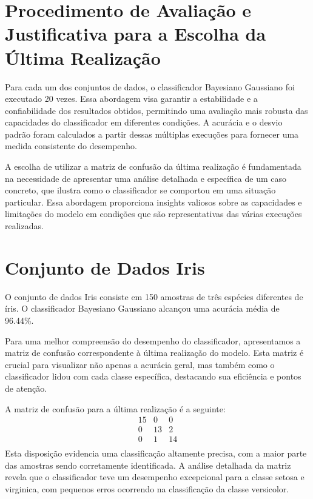 \documentclass[12pt, a4paper]{report}
\begin{document}
\section{Procedimento de Avaliação e Justificativa para a Escolha da Última Realização}

Para cada um dos conjuntos de dados, o classificador Bayesiano Gaussiano foi executado 20 vezes. Essa abordagem visa garantir a estabilidade e a confiabilidade dos resultados obtidos, permitindo uma avaliação mais robusta das capacidades do classificador em diferentes condições. A acurácia e o desvio padrão foram calculados a partir dessas múltiplas execuções para fornecer uma medida consistente do desempenho.

A escolha de utilizar a matriz de confusão da última realização é fundamentada na necessidade de apresentar uma análise detalhada e específica de um caso concreto, que ilustra como o classificador se comportou em uma situação particular. Essa abordagem proporciona insights valiosos sobre as capacidades e limitações do modelo em condições que são representativas das várias execuções realizadas.


\section{Conjunto de Dados Iris}

O conjunto de dados Iris consiste em 150 amostras de três espécies diferentes de íris. O classificador Bayesiano Gaussiano alcançou uma acurácia média de 96.44\%.

Para uma melhor compreensão do desempenho do classificador, apresentamos a matriz de confusão correspondente à última realização do modelo. Esta matriz é crucial para visualizar não apenas a acurácia geral, mas também como o classificador lidou com cada classe específica, destacando sua eficiência e pontos de atenção.

A matriz de confusão para a última realização é a seguinte:
\[
\begin{array}{ccc}
15 & 0 & 0 \\
0 & 13 & 2 \\
0 & 1 & 14 \\
\end{array}
\]
Esta disposição evidencia uma classificação altamente precisa, com a maior parte das amostras sendo corretamente identificada. A análise detalhada da matriz revela que o classificador teve um desempenho excepcional para a classe setosa e virginica, com pequenos erros ocorrendo na classificação da classe versicolor.
\end{document}
